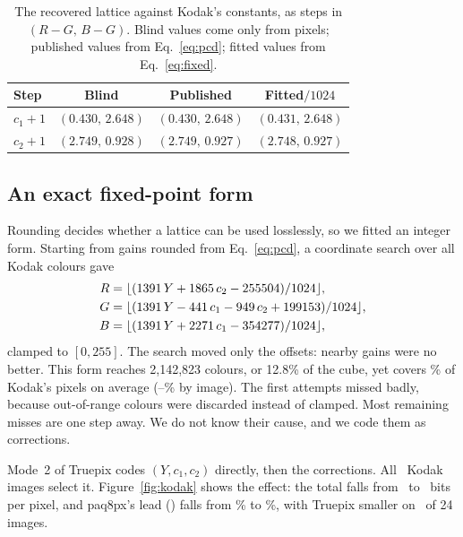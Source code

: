 \documentclass[10pt,twocolumn]{article}
\begin{document}
\begin{table}[t]
\centering\small
\caption{The recovered lattice against Kodak's constants, as steps in $(R-G,\,B-G)$. Blind values come only from pixels; published values from Eq.~\ref{eq:pcd}; fitted values from Eq.~\ref{eq:fixed}.}
\label{tab:constants}
\footnotesize\setlength{\tabcolsep}{3.5pt}
\begin{tabular}{@{}lccc@{}}
\toprule
Step & Blind & Published & Fitted$/1024$\\
\midrule
$c_1{+}1$ & $(0.430,\,2.648)$ & $(0.430,\,2.648)$ & $(0.431,\,2.648)$\\
$c_2{+}1$ & $(2.749,\,0.928)$ & $(2.749,\,0.927)$ & $(2.748,\,0.927)$\\
\bottomrule
\end{tabular}
\end{table}

\subsection{An exact fixed-point form}

Rounding decides whether a lattice can be used losslessly, so we fitted an integer form. Starting from gains rounded from Eq.~\ref{eq:pcd}, a coordinate search over all Kodak colours gave
\begin{align}
R &= \lfloor(1391\,Y + 1865\,c_2 - 255504)/1024\rfloor, \notag\\
G &= \lfloor(1391\,Y - 441\,c_1 - 949\,c_2 + 199153)/1024\rfloor, \notag\\
B &= \lfloor(1391\,Y + 2271\,c_1 - 354277)/1024\rfloor, \label{eq:fixed}
\end{align}
clamped to $[0,255]$. The search moved only the offsets: nearby gains were no better. This form reaches 2,142,823 colours, or 12.8\% of the cube, yet covers \kshare\% of Kodak's pixels on average (\ksharelo--\ksharehi\% by image). The first attempts missed badly, because out-of-range colours were discarded instead of clamped. Most remaining misses are one step away. We do not know their cause, and we code them as corrections.

Mode~2 of Truepix codes $(Y,c_1,c_2)$ directly, then the corrections. All \kmodetwo\ Kodak images select it. Figure~\ref{fig:kodak} shows the effect: the total falls from \kbeforebpp\ to \kfinalbpp\ bits per pixel, and paq8px's lead (\kpaqbpp) falls from \kpaqgapbefore\% to \kpaqgap\%, with Truepix smaller on \kpaqwins\ of 24 images.
\end{document}
